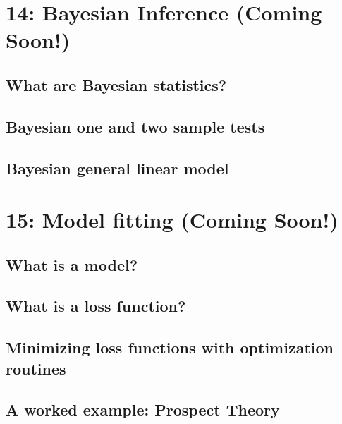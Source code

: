 \documentclass{tufte-book}\usepackage[]{graphicx}\usepackage[]{color}
\begin{document}
\begin{footnotesize}

\chapter{14: Bayesian Inference (Coming Soon!)}
\label{ch:14}


\section{What are Bayesian statistics?}
\section{Bayesian one and two sample tests}
\section{Bayesian general linear model}



\chapter{15: Model fitting (Coming Soon!)}
\label{ch:15}


\section{What is a model?}
\section{What is a loss function?}
\section{Minimizing loss functions with optimization routines}
\section{A worked example: Prospect Theory}




\end{footnotesize}
\end{document}
